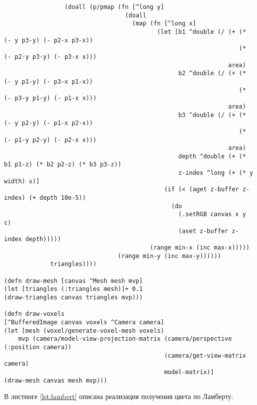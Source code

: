 \begin{lstlisting}
                 (doall (p/pmap (fn [^long y]
                                  (doall
                                    (map (fn [^long x]
                                           (let [b1 ^double (/ (+ (* (- y p3-y) (- p2-x p3-x))
                                                                  (* (- p2-y p3-y) (- p3-x x)))
                                                               area)
                                                 b2 ^double (/ (+ (* (- y p1-y) (- p3-x p1-x))
                                                                  (* (- p3-y p1-y) (- p1-x x)))
                                                               area)
                                                 b3 ^double (/ (+ (* (- y p2-y) (- p1-x p2-x))
                                                                  (* (- p1-y p2-y) (- p2-x x)))
                                                               area)
                                                 depth ^double (+ (* b1 p1-z) (* b2 p2-z) (* b3 p3-z))
                                                 z-index ^long (+ (* y width) x)]
                                             (if (< (aget z-buffer z-index) (+ depth 10e-5))
                                               (do
                                                 (.setRGB canvas x y c)
                                                 (aset z-buffer z-index depth)))))
                                         (range min-x (inc max-x)))))
                                (range min-y (inc max-y))))))
             triangles))))

(defn draw-mesh [canvas ^Mesh mesh mvp]
(let [triangles (:triangles mesh)]+ 0.1
(draw-triangles canvas triangles mvp)))

(defn draw-voxels
[^BufferedImage canvas voxels ^Camera camera]
(let [mesh (voxel/generate-voxel-mesh voxels)
    mvp (camera/model-view-projection-matrix (camera/perspective (:position camera))
                                             (camera/get-view-matrix camera)
                                             model-matrix)]
(draw-mesh canvas mesh mvp)))
\end{lstlisting}

В листинге \ref{lst:lambert} описана реализация получения цвета по Ламберту.

